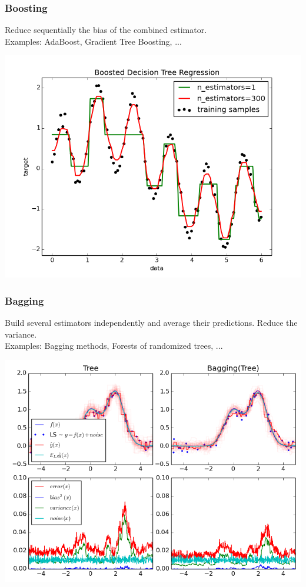 \begin{frame}
\frametitle{Boosting}

Reduce sequentially the bias of the combined
estimator. \\

Examples: AdaBoost, Gradient Tree Boosting, ...\\

\begin{center}
\includegraphics[width=.6\linewidth]{sklearn_material/plot_adaboost_regression.png}
\end{center}

\end{frame}


\begin{frame}
\frametitle{Bagging}

Build several estimators independently and average their
predictions. Reduce the variance.\\

Examples: Bagging methods, Forests of randomized trees, ...\\

\begin{center}
\includegraphics[width=.6\linewidth]{sklearn_material/bias_variance.png}
\end{center}

\end{frame}



